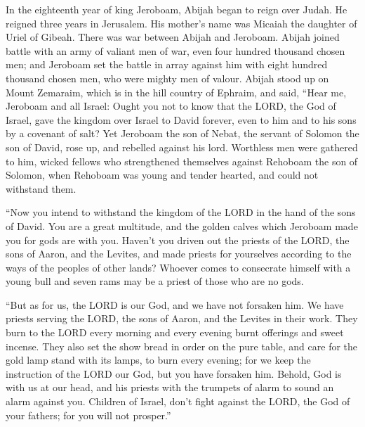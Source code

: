  In the eighteenth year of king Jeroboam, Abijah began to
reign over Judah.  He reigned three years in Jerusalem. His
mother's name was Micaiah the daughter of Uriel of Gibeah. There was war
between Abijah and Jeroboam.  Abijah joined battle with an
army of valiant men of war, even four hundred thousand chosen men; and
Jeroboam set the battle in array against him with eight hundred thousand
chosen men, who were mighty men of valour.  Abijah stood up
on Mount Zemaraim, which is in the hill country of Ephraim, and said,
``Hear me, Jeroboam and all Israel:  Ought you not to know
that the LORD, the God of Israel, gave the kingdom over Israel to David
forever, even to him and to his sons by a covenant of salt? 
Yet Jeroboam the son of Nebat, the servant of Solomon the son of David,
rose up, and rebelled against his lord.  Worthless men were
gathered to him, wicked fellows who strengthened themselves against
Rehoboam the son of Solomon, when Rehoboam was young and tender hearted,
and could not withstand them.

 ``Now you intend to withstand the kingdom of the LORD in
the hand of the sons of David. You are a great multitude, and the golden
calves which Jeroboam made you for gods are with you. 
Haven't you driven out the priests of the LORD, the sons of Aaron, and
the Levites, and made priests for yourselves according to the ways of
the peoples of other lands? Whoever comes to consecrate himself with a
young bull and seven rams may be a priest of those who are no gods.

 ``But as for us, the LORD is our God, and we have not
forsaken him. We have priests serving the LORD, the sons of Aaron, and
the Levites in their work.  They burn to the LORD every
morning and every evening burnt offerings and sweet incense. They also
set the show bread in order on the pure table, and care for the gold
lamp stand with its lamps, to burn every evening; for we keep the
instruction of the LORD our God, but you have forsaken him.
 Behold, God is with us at our head, and his priests with
the trumpets of alarm to sound an alarm against you. Children of Israel,
don't fight against the LORD, the God of your fathers; for you will not
prosper.''

